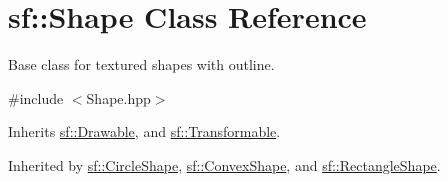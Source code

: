 \hypertarget{classsf_1_1_shape}{\section{sf\+:\+:Shape Class Reference}
\label{classsf_1_1_shape}
}


Base class for textured shapes with outline.  




{\ttfamily \#include $<$Shape.\+hpp$>$}



Inherits \hyperlink{classsf_1_1_drawable}{sf\+::\+Drawable}, and \hyperlink{classsf_1_1_transformable}{sf\+::\+Transformable}.



Inherited by \hyperlink{classsf_1_1_circle_shape}{sf\+::\+Circle\+Shape}, \hyperlink{classsf_1_1_convex_shape}{sf\+::\+Convex\+Shape}, and \hyperlink{classsf_1_1_rectangle_shape}{sf\+::\+Rectangle\+Shape}.

